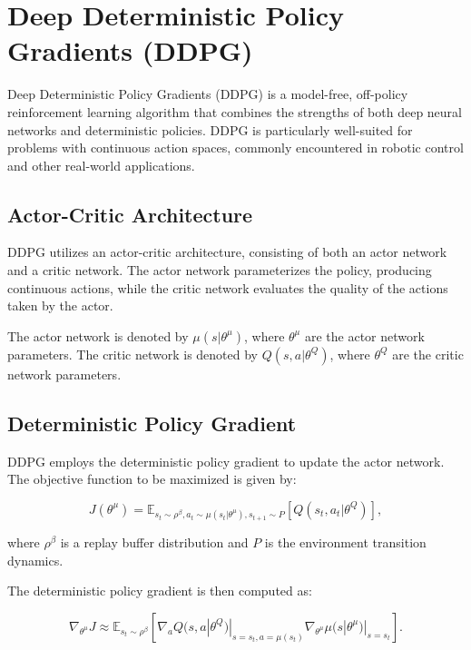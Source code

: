 \documentclass[conference]{IEEEtran}
\begin{document}
\section{Deep Deterministic Policy Gradients (DDPG)}

Deep Deterministic Policy Gradients (DDPG) is a model-free, off-policy reinforcement learning algorithm that combines the strengths of both deep neural networks and deterministic policies. DDPG is particularly well-suited for problems with continuous action spaces, commonly encountered in robotic control and other real-world applications.

\subsection{Actor-Critic Architecture}

DDPG utilizes an actor-critic architecture, consisting of both an actor network and a critic network. The actor network parameterizes the policy, producing continuous actions, while the critic network evaluates the quality of the actions taken by the actor.

The actor network is denoted by $\mu(s|\theta^{\mu})$, where $\theta^{\mu}$ are the actor network parameters. The critic network is denoted by $Q(s, a|\theta^{Q})$, where $\theta^{Q}$ are the critic network parameters.

\subsection{Deterministic Policy Gradient}

DDPG employs the deterministic policy gradient to update the actor network. The objective function to be maximized is given by:

\begin{equation}
J(\theta^{\mu}) = \mathbb{E}_{s_t \sim \rho^{\beta}, a_t \sim \mu(s_t|\theta^{\mu}), s_{t+1} \sim P} \left[ Q(s_t, a_t|\theta^{Q}) \right],
\end{equation}

where $\rho^{\beta}$ is a replay buffer distribution and $P$ is the environment transition dynamics.

The deterministic policy gradient is then computed as:

\begin{equation}
\nabla_{\theta^{\mu}} J \approx \mathbb{E}_{s_t \sim \rho^{\beta}} \left[ \nabla_{a} Q(s, a|\theta^{Q}) |_{s=s_t, a=\mu(s_t)} \nabla_{\theta^{\mu}} \mu(s|\theta^{\mu}) |_{s=s_t} \right].
\end{equation}
\end{document}
